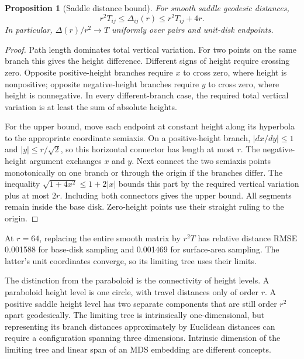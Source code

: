 \documentclass[11pt]{article}
\newtheorem{proposition}{Proposition}[section]
\theoremstyle{remark}\newtheorem{remark}[proposition]{Remark}
\begin{document}
\begin{proposition}[Saddle distance bound]\label{prop:tree-bound}
For smooth saddle geodesic distances,
\begin{equation}\label{eq:tree-bound}
 r^2T_{ij}\le\Delta_{ij}(r)\le r^2T_{ij}+4r.
\end{equation}
In particular, $\Delta(r)/r^2\to T$ uniformly over pairs and unit-disk endpoints.
\end{proposition}
\begin{proof}
Path length dominates total vertical variation. For two points on the same
branch this gives the height difference. Different signs of height require
crossing zero. Opposite positive-height branches require $x$ to cross zero,
where height is nonpositive; opposite negative-height branches require $y$
to cross zero, where height is nonnegative. In every different-branch case,
the required total vertical variation is at least the sum of absolute heights.

For the upper bound, move each endpoint at constant height along its hyperbola
to the appropriate coordinate semiaxis. On a positive-height branch,
$|dx/dy|\le1$ and $|y|\le r/\sqrt2$, so this horizontal connector has length
at most $r$. The negative-height argument exchanges $x$ and $y$. Next connect
the two semiaxis points monotonically on one branch or through the origin if
the branches differ. The inequality $\sqrt{1+4x^2}\le1+2|x|$ bounds this part
by the required vertical variation plus at most $2r$. Including both connectors
gives the upper bound. All segments remain inside the base disk. Zero-height
points use their straight ruling to the origin.
\end{proof}

At $r=64$, replacing the entire smooth matrix by $r^2T$ has relative distance
RMSE 0.001588 for base-disk sampling and 0.001469 for surface-area sampling.
The latter's unit coordinates converge, so its limiting tree uses their limits.

The distinction from the paraboloid is the connectivity of height levels. A
paraboloid height level is one circle, with travel distances only of order $r$.
A positive saddle height level has two separate components that are still
order $r^2$ apart geodesically. The limiting tree is intrinsically
one-dimensional, but representing its branch distances approximately by
Euclidean distances can require a configuration spanning three dimensions.
Intrinsic dimension of the limiting tree and linear span of an MDS embedding
are different concepts.
\end{document}
